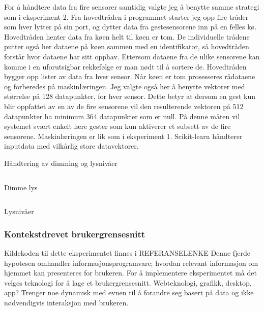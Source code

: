 For å håndtere data fra fire sensorer samtidig valgte jeg å benytte samme strategi som i eksperiment 2. Fra hovedtråden i programmet starter jeg opp fire tråder som hver lytter på sin port, og dytter data fra gestesensorene inn på en felles kø. Hovedtråden henter data fra køen helt til køen er tom. De individuelle trådene putter også her dataene på køen sammen med en identifikator, så hovedtråden forstår hvor dataene har sitt opphav. Ettersom dataene fra de ulike sensorene kan komme i en uforutsigbar rekkefølge er man nødt til å sortere de. Hovedtråden bygger opp lister av data fra hver sensor. Når køen er tom prosesseres rådataene og forberedes på maskinlæringen. Jeg valgte også her å benytte vektorer med størrelse på 128 datapunkter, for hver sensor. Dette betyr at dersom en gest kun blir oppfattet av en av de fire sensorene vil den resulterende vektoren på 512 datapunkter ha minimum 364 datapunkter som er null. På denne måten vil systemet svært enkelt lære gester som kun aktiverer et subsett av de fire sensorene. Maskinlæringen er lik som i eksperiment 1. Scikit-learn håndterer inputdata med vilkårlig store datavektorer.

{\color{red}Håndtering av dimming og lysnivåer}

\begin{listing}[ht]
\inputminted[fontsize=\footnotesize, linenos]{python}{kodesnutter/dimming.py}
\label{code:dim}
\caption{Dimme lys}
\end{listing}

\begin{listing}[ht]
\inputminted[fontsize=\footnotesize, linenos]{python}{kodesnutter/lighting.py}
\label{code:light}
\caption{Lysnivåer}
\end{listing}

\subsubsection{Kontekstdrevet brukergrensesnitt}
{\color{red}Kildekoden til dette eksperimentet finnes i REFERANSELENKE}
Denne fjerde hypotesen omhandler informasjonsprogramvare; hvordan relevant informasjon om hjemmet kan presenteres for brukeren. For å implementere eksperimentet må det velges teknologi for å lage et brukergrensesnitt. Webteknologi, grafikk, desktop, app? Trenger noe dynamisk med evnen til å forandre seg basert på data og ikke nødvendigvis interaksjon med brukeren.

